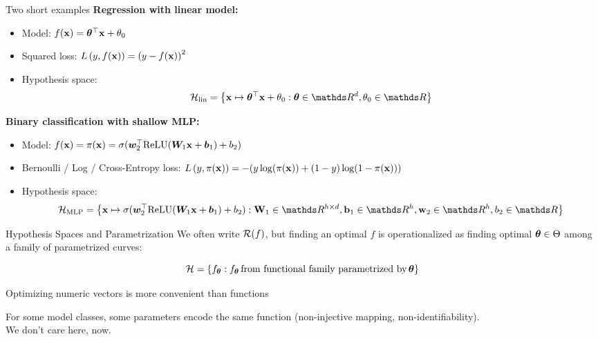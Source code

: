 \documentclass[11pt,compress,t,notes=noshow, xcolor=table]{beamer}
\begin{document}
\begin{vbframe}{Two short examples}
\textbf{Regression with linear model:}\\
\begin{itemize}
    \item Model: $f(\mathbf{x}) = \bm{\theta}^\top \mathbf{x} + \theta_0$
    \item Squared loss:  
    $L\left(y, f(\mathbf{x})\right) = \left(y-f(\mathbf{x})\right)^2$
    \item Hypothesis space: $$\Hspace_{\text{lin}} = \left\{ \xv \mapsto \thetav^\top \xv + \theta_0 : \thetav \in \R^d, \theta_0 \in \R \right\}$$
\end{itemize}

\vspace{0.3cm}

\textbf{Binary classification with shallow MLP:}\\
\begin{itemize}
    \item Model: $f(\mathbf{x}) = \pi(\mathbf{x})= \sigma(\bm{w}_2^{\top} \text{ReLU}(\bm{W}_1 \mathbf{x} + \bm{b}_1) + b_2)$
    \item Bernoulli / Log / Cross-Entropy loss: $L\left(y, \pi(\mathbf{x})\right) = -(y\log(\pi(\mathbf{x}))+(1-y)\log(1-\pi(\mathbf{x})))$\\ 
    \item Hypothesis space: {\small $$\Hspace_{\text{MLP}} = \left\{ \xv \mapsto \sigma(\bm{w}_2^{\top} \text{ReLU}(\bm{W}_1 \xv + \bm{b}_1) + b_2): \mathbf{W}_1 \in \R^{h \times d}, \mathbf{b}_1 \in \R^h, \mathbf{w}_2 \in \R^h, b_2 \in \R \right\}$$}
\end{itemize}
  
\end{vbframe}

\begin{vbframe}{Hypothesis Spaces and Parametrization}
We often write $\mathcal{R}(f)$, but finding an optimal $f$ is operationalized as finding optimal $\bm{\theta} \in \Theta$ among a family of parametrized curves:

$$\mathcal{H} = \{f_{\bm{\theta}}: f_{\bm{\theta}}\,\text{from functional family parametrized by}\,\bm{\theta}\}$$

\vfill


\begin{itemizeL}
    \item Optimizing numeric vectors is more convenient than functions
\item For some model classes, some parameters encode the same function (non-injective mapping, non-identifiability). \\
We don't care here, now. 
\end{itemizeL}

\end{vbframe}
\end{document}
